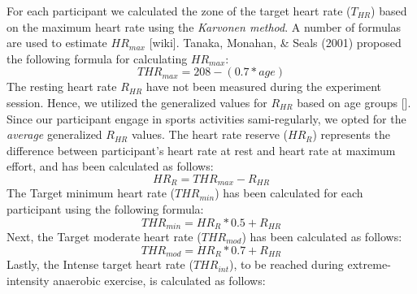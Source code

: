 For each participant we calculated the zone of the target heart rate (\begin{math} T_{HR}\end{math}) based on the maximum heart rate using the \textit{Karvonen method}. A number of formulas are used to estimate  \begin{math} HR_{max}\end{math} [wiki]. Tanaka, Monahan, \& Seals (2001) proposed the following formula for calculating \begin{math}HR_{max}\end{math}:\\
\begin{equation}
THR_{max} = 208-(0.7 * age)
\end{equation}The resting heart rate \begin{math} R_{HR}\end{math} have not been measured during the experiment session. Hence, we utilized the generalized values for \begin{math} R_{HR}\end{math} based on age groups []. Since our participant engage in sports activities sami-regularly, we opted for the \textit{average} generalized \begin{math} R_{HR}\end{math} values. The heart rate reserve (\begin{math} HR_{R}\end{math}) represents the difference between participant's heart rate at rest and heart rate at maximum effort, and has been calculated as follows: \begin{equation}
HR_{R} = THR_{max} - R_{HR} 
\end{equation}The Target minimum heart rate (\begin{math} THR_{min}\end{math}) has been calculated for each participant using the following formula:\begin{equation}
THR_{min} =  HR_{R}*0.5 + R_{HR} 
\end{equation}
Next, the Target moderate heart rate (\begin{math} THR_{mod}\end{math}) has been calculated as follows:\begin{equation}
THR_{mod} =  HR_{R}*0.7 + R_{HR} 
\end{equation}Lastly, the Intense target heart rate (\begin{math} THR_{int}\end{math}), to be reached during extreme-intensity anaerobic exercise, is calculated as follows: 
